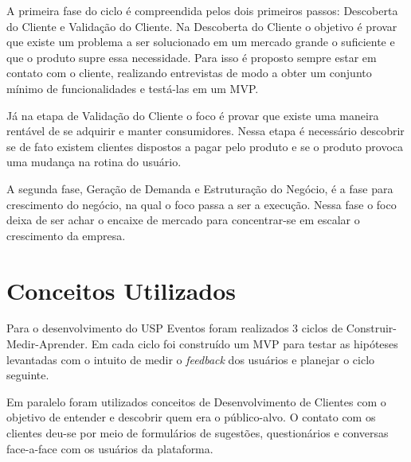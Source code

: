 \par A primeira fase do ciclo é compreendida pelos dois primeiros passos: Descoberta do Cliente e Validação do Cliente. Na Descoberta do Cliente o objetivo é provar que existe um problema a ser solucionado em um mercado grande o suficiente e que o produto supre essa necessidade. Para isso é proposto sempre estar em contato com o cliente, realizando entrevistas de modo a obter um conjunto mínimo de funcionalidades e testá-las em um MVP.
\par Já na etapa de Validação do Cliente o foco é provar que existe uma maneira rentável de se adquirir e manter consumidores. Nessa etapa é necessário descobrir se de fato existem clientes dispostos a pagar pelo produto e se o produto provoca uma mudança na rotina do usuário.
\par A segunda fase, Geração de Demanda e Estruturação do Negócio, é a fase para crescimento do negócio, na qual o foco passa a ser a execução. Nessa fase o foco deixa de ser achar o encaixe de mercado para concentrar-se em escalar o crescimento da empresa.

\section{Conceitos Utilizados}
\par Para o desenvolvimento do USP Eventos foram realizados 3 ciclos de Construir-Medir-Aprender. Em cada ciclo foi construído um MVP para testar as hipóteses levantadas com o intuito de medir o \emph{feedback} dos usuários e planejar o ciclo seguinte.
\par Em paralelo foram utilizados conceitos de Desenvolvimento de Clientes com o objetivo de entender e descobrir quem era o público-alvo.  O contato com os clientes deu-se por meio de formulários de sugestões, questionários e conversas face-a-face com os usuários da plataforma.
